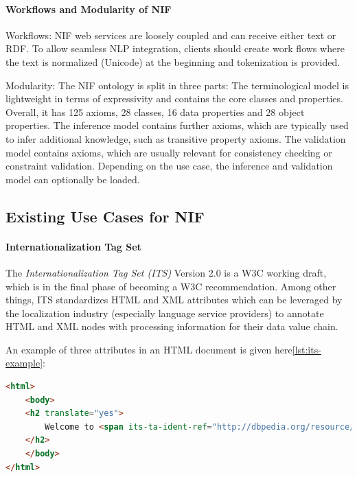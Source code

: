 \documentclass[thesis=M,english,hidelinks]{FITthesis}[2019/12/23]
\begin{document}
\paragraph{Workflows and Modularity of NIF}

Workflows: NIF web services are loosely coupled and can receive either text or RDF. To allow seamless NLP integration, clients should create work flows where the text is normalized (Unicode) at the beginning and tokenization is provided.

Modularity: The NIF ontology is split in three parts: The terminological model is lightweight in terms of expressivity and contains the core classes
and properties. Overall, it has 125 axioms, 28 classes, 16 data properties and 28 object properties. The inference model contains further axioms, which are typically used to infer additional knowledge, such as transitive property axioms. The validation model contains axioms, which are usually relevant for consistency checking or constraint validation. Depending on the use case, the inference and validation model can
optionally be loaded. 

\subsection{Existing Use Cases for NIF}

\paragraph{Internationalization Tag Set}
The \textit{Internationalization Tag Set (ITS)} Version 2.0 is a W3C working draft, which is in the final phase of becoming a W3C recommendation. Among other things, ITS standardizes HTML and XML attributes which can be leveraged by the localization industry (especially language service providers) to annotate HTML and XML nodes with processing information for their data value chain.

An example of three attributes in an HTML document is given here\ref{lst:its-example}:

\begin{lstlisting}[language=HTML, caption=Example of Internationalization Tag Set HTML Code, label = {lst:its-example}]
<html> 
	<body>
	<h2 translate="yes"> 
		Welcome to <span its-ta-ident-ref="http://dbpedia.org/resource/Dublin" its-within- text="yes" translate ="no"> Dublin </span> in <b translate ="no" its-within-text="yes"> Ireland </b>! 
	</h2> 
	</body> 
</html>
\end{lstlisting}
\end{document}
